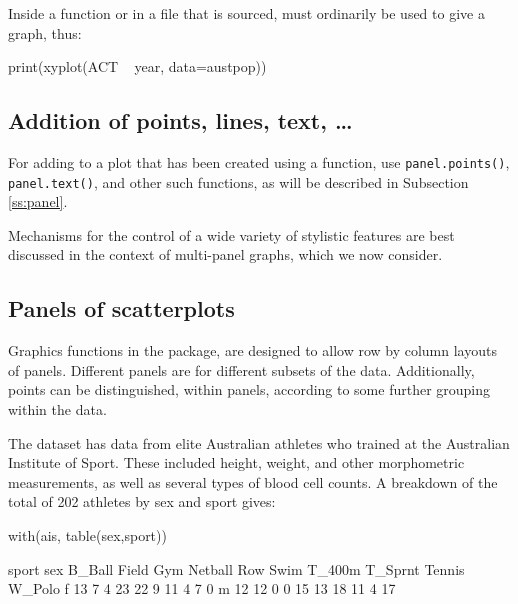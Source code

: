 Inside a function
or in a file that is sourced,  must
ordinarily be used to give a graph, thus:
\begin{Schunk}
\begin{Sinput}
print(xyplot(ACT ~ year, data=austpop))
\end{Sinput}
\end{Schunk}

\subsection*{Addition of points, lines, text, \ldots}
For adding
to a plot that has been created using a  function,
use \verb!panel.points()!, \verb!panel.text()!, and other such
functions, as will be described in Subsection \ref{ss:panel}.

Mechanisms for the control of a wide variety of stylistic
features are best discussed in the context of multi-panel
graphs, which we now consider.

\subsection{Panels of scatterplots}

Graphics functions in the  package, are designed to
allow row by column layouts of panels.  Different panels are for
different subsets of the data.  Additionally, points can be
distinguished, within panels, according to some further grouping
within the data.

The  dataset has data
from elite Australian athletes who trained at the Australian
Institute of Sport. These included height, weight, and other
morphometric measurements, as well as several types of blood
cell counts.  A breakdown of the total of 202 athletes by sex
and sport gives:
\begin{fullwidth}
\begin{Schunk}
\begin{Sinput}
with(ais, table(sex,sport))
\end{Sinput}
\begin{Soutput}
   sport
sex B_Ball Field Gym Netball Row Swim T_400m T_Sprnt Tennis W_Polo
  f     13     7   4      23  22    9     11       4      7      0
  m     12    12   0       0  15   13     18      11      4     17
\end{Soutput}
\end{Schunk}
\end{fullwidth}
\noindent

